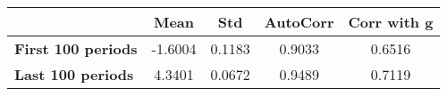 \begin{tiny}\begin{tabular}{|l|c|c|c|c|}
\hline
&\textbf{Mean}&\textbf{Std}&\textbf{AutoCorr}&\textbf{Corr with g}\\\hline
\textbf{First 100 periods}&-1.6004&0.1183&0.9033&0.6516\\\hline
\textbf{Last 100 periods}&4.3401&0.0672&0.9489&0.7119\\\hline
\end{tabular}
\end{tiny}